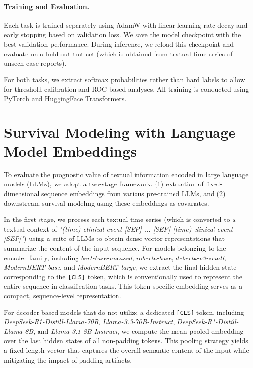 \paragraph{Training and Evaluation.}
Each task is trained separately using AdamW with linear learning rate decay and early stopping based on validation loss. 
We save the model checkpoint with the best validation performance. 
During inference, we reload this checkpoint and evaluate on a held-out test set (which is obtained from textual time series of unseen case reports).

For both tasks, we extract softmax probabilities rather than hard labels to allow for threshold calibration and ROC-based analyses. 
All training is conducted using PyTorch and HuggingFace Transformers.

\section{Survival Modeling with Language Model Embeddings}
\label{apd:encoder-survival}

To evaluate the prognostic value of textual information encoded in large language models (LLMs), we adopt a two-stage framework: (1) extraction of fixed-dimensional sequence embeddings from various pre-trained LLMs, and (2) downstream survival modeling using these embeddings as covariates.

In the first stage, we process each textual time series (which is converted to a textual context of \emph{"(time) clinical event [SEP] ... [SEP] (time) clinical event [SEP]"}) using a suite of LLMs to obtain dense vector representations that summarize the content of the input sequence. 
For models belonging to the encoder family, including \textit{bert-base-uncased}, \textit{roberta-base}, \textit{deberta-v3-small}, \textit{ModernBERT-base}, and \textit{ModernBERT-large}, we extract the final hidden state corresponding to the \texttt{[CLS]} token, which is conventionally used to represent the entire sequence in classification tasks. 
This token-specific embedding serves as a compact, sequence-level representation.

For decoder-based models that do not utilize a dedicated \texttt{[CLS]} token, including \textit{DeepSeek-R1-Distill-Llama-70B}, \textit{Llama-3.3-70B-Instruct}, \textit{DeepSeek-R1-Distill-Llama-8B}, and \textit{Llama-3.1-8B-Instruct}, we compute the mean-pooled embedding over the last hidden states of all non-padding tokens. 
This pooling strategy yields a fixed-length vector that captures the overall semantic content of the input while mitigating the impact of padding artifacts.

